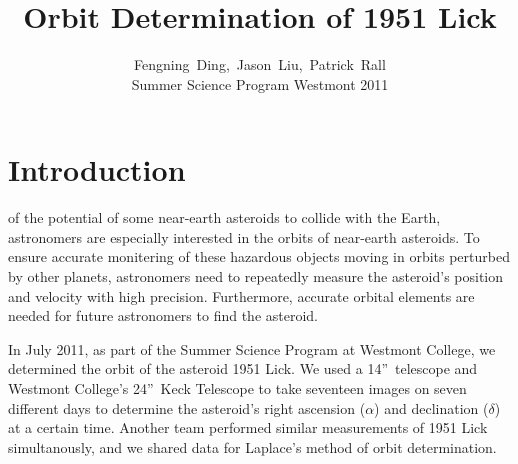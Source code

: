 \documentclass[12pt,journal,compsoc]{IEEEtran}
\begin{document}
\title{Orbit Determination of 1951 Lick}

\author{Fengning~Ding,~Jason~Liu,~Patrick~Rall \\Summer Science Program Westmont 2011}%



\maketitle

\IEEEdisplaynotcompsoctitleabstractindextext
\IEEEpeerreviewmaketitle

\section{Introduction}
of the potential of some near-earth asteroids to collide with the Earth, astronomers are especially interested in the orbits of near-earth asteroids.
To ensure accurate monitering of these hazardous objects moving in orbits perturbed by other planets, astronomers need to repeatedly measure the asteroid's position and velocity with high precision.
Furthermore, accurate orbital elements are needed for future astronomers to find the asteroid.

In July 2011, as part of the Summer Science Program at Westmont College, we determined the orbit of the asteroid 1951 Lick. We used a 14''~telescope and Westmont College's 24''~Keck Telescope to take seventeen images on seven different days to determine the asteroid's right ascension ($\alpha$) and declination ($\delta$) at a certain time. 
Another team performed similar measurements of 1951 Lick simultanously, and we shared data for Laplace's method of orbit determination.
\end{document}
